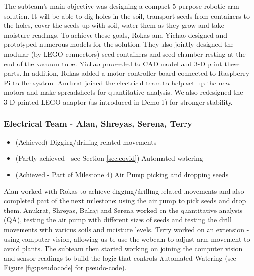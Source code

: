 \documentclass{article}
\begin{document}
The subteam's main objective was designing a compact 5-purpose robotic arm solution. It will be able to dig holes in the soil, transport seeds from containers to the holes, cover the seeds up with soil, water them as they grow and take moisture readings. To achieve these goals, Rokas and Yichao designed and prototyped numerous models for the solution. They also jointly designed the modular (by LEGO connectors) seed containers and seed chamber resting at the end of the vacuum tube. Yichao proceeded to CAD model and 3-D print these parts. In addition, Rokas added a motor controller board connected to Raspberry Pi to the system. Anukrat joined the electrical team to help set up the new motors and make spreadsheets for quantitative analysis. We also redesigned the 3-D printed LEGO adaptor (as introduced in Demo 1) for stronger stability.

\subsubsection{\textbf{Electrical Team - Alan, Shreyas, Serena, Terry}}
\vspace{3mm}

\vspace{1mm}
\begin{itemize}
    \setlength\itemsep{0.01em}
    \setlength\parskip{0pt}
    \item (Achieved) Digging/drilling related movements
    \item (Partly achieved - see Section \ref{sec:covid}) Automated  watering
    \item (Achieved - Part of Milestone 4) Air Pump picking and dropping seeds
\end{itemize}
Alan worked with Rokas to achieve digging/drilling related movements and also completed part of the next milestone: using the air pump to pick seeds and drop them. Anukrat, Shreyas, Balraj and Serena worked on the quantitative analysis (QA), testing the air pump with different sizes of seeds and testing the drill movements with various soils and moisture levels. Terry worked on an extension - using computer vision, allowing us to use the webcam to adjust arm movement to avoid plants. The subteam then started working on joining the computer vision and sensor readings to build the logic that controls Automated Watering (see Figure \ref{fig:pseudocode} for pseudo-code).
\end{document}
